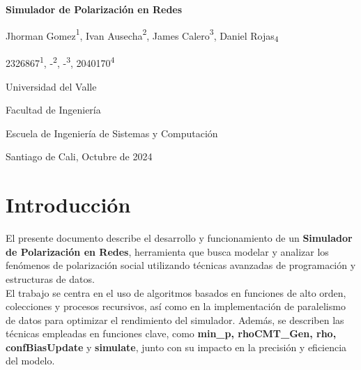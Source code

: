 \documentclass{article}
\begin{document}
  \begin{titlepage}
    \centering
    \vspace*{2cm}
    
    \Huge
    \textbf{Simulador de Polarización en Redes}
    
    \vspace{1.5cm}
    
    \Large
    Jhorman Gomez{\textsuperscript{1}}, Ivan Ausecha{\textsuperscript{2}}, James Calero{\textsuperscript{3}}, Daniel Rojas{\textsubscript{4}}
    
    \vspace{0.5cm}
    
    \large
    2326867{\textsuperscript{1}}, -{\textsuperscript{2}}, -{\textsuperscript{3}}, 2040170{\textsuperscript{4}}
    
    \vspace{0.5cm}
    
    \Large
    Universidad del Valle
    
    \vspace{0.5cm}
    
    \large
    Facultad de Ingeniería
    
    \vspace{0.5cm}
    
    \large
    Escuela de Ingeniería de Sistemas y Computación
    
    \vspace{0.5cm}
    
    \large
    Santiago de Cali, Octubre de 2024
    
  \end{titlepage}
\section{Introducción}
El presente documento describe el desarrollo y funcionamiento de un \textbf{Simulador de Polarización en Redes}, herramienta que busca modelar y analizar los fenómenos de polarización social utilizando técnicas avanzadas de programación y estructuras de datos. 
\\

El trabajo se centra en el uso de algoritmos basados en funciones de alto orden, colecciones y procesos recursivos, así como en la implementación de paralelismo de datos para optimizar el rendimiento del simulador. Además, se describen las técnicas empleadas en funciones clave, como \textbf{min\_p, rhoCMT\_Gen, rho, confBiasUpdate} y \textbf{simulate}, junto con su impacto en la precisión y eficiencia del modelo.
\\
\end{document}
